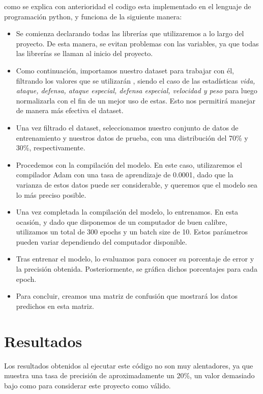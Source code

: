 \documentclass[]{elsarticle}
\begin{document}
como se explica con anterioridad el codigo esta implementado en el lenguaje de programación python, y funciona de la siguiente manera:

\begin{itemize}
    \item Se comienza declarando todas las librerías que utilizaremos a lo largo del proyecto. De esta manera, se evitan problemas con las variables, ya que todas las librerías se llaman al inicio del proyecto.
    \item Como continuación, importamos nuestro dataset para trabajar con él, filtrando los valores que se utilizarán , siendo el caso de las estadísticas \textit{vida, ataque, defensa, ataque especial, defensa especial, velocidad y peso} para luego normalizarla con el fin de un mejor uso de estas. Esto nos permitirá manejar de manera más efectiva el dataset.
    \item Una vez filtrado el dataset, seleccionamos nuestro conjunto de datos de entrenamiento y nuestros datos de prueba, con una distribución del 70\% y 30\%, respectivamente.
    \item Procedemos con la compilación del modelo. En este caso, utilizaremos el compilador Adam con una tasa de aprendizaje de 0.0001, dado que la varianza de estos datos puede ser considerable, y queremos que el modelo sea lo más preciso posible.
    \item Una vez completada la compilación del modelo, lo entrenamos. En esta ocasión, y dado que disponemos de un computador de buen calibre, utilizamos un total de 300 epochs y un batch size de 10. Estos parámetros pueden variar dependiendo del computador disponible.
    \item Tras entrenar el modelo, lo evaluamos para conocer su porcentaje de error y la precisión obtenida. Posteriormente, se gráfica dichos porcentajes para cada epoch.
    \item Para concluir, creamos una matriz de confusión que mostrará los datos predichos en esta matriz.
\end{itemize}
  


\section{Resultados}
Los resultados obtenidos al ejecutar este código no son muy alentadores, ya que muestra una tasa de precisión de aproximadamente un  20\%, un valor demasiado bajo como para considerar este proyecto como válido.
\end{document}
